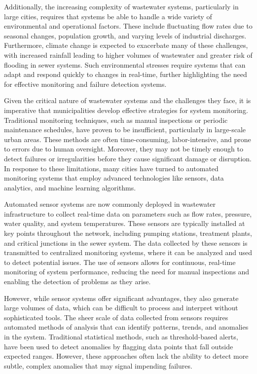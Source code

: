 \documentclass[conference]{IEEEtran}
\begin{document}
Additionally, the increasing complexity of wastewater systems, particularly in large cities, requires that systems be able to handle a wide variety of environmental and operational factors. These include fluctuating flow rates due to seasonal changes, population growth, and varying levels of industrial discharges. Furthermore, climate change is expected to exacerbate many of these challenges, with increased rainfall leading to higher volumes of wastewater and greater risk of flooding in sewer systems. Such environmental stresses require systems that can adapt and respond quickly to changes in real-time, further highlighting the need for effective monitoring and failure detection systems.

Given the critical nature of wastewater systems and the challenges they face, it is imperative that municipalities develop effective strategies for system monitoring. Traditional monitoring techniques, such as manual inspections or periodic maintenance schedules, have proven to be insufficient, particularly in large-scale urban areas. These methods are often time-consuming, labor-intensive, and prone to errors due to human oversight. Moreover, they may not be timely enough to detect failures or irregularities before they cause significant damage or disruption. In response to these limitations, many cities have turned to automated monitoring systems that employ advanced technologies like sensors, data analytics, and machine learning algorithms.

Automated sensor systems are now commonly deployed in wastewater infrastructure to collect real-time data on parameters such as flow rates, pressure, water quality, and system temperatures. These sensors are typically installed at key points throughout the network, including pumping stations, treatment plants, and critical junctions in the sewer system. The data collected by these sensors is transmitted to centralized monitoring systems, where it can be analyzed and used to detect potential issues. The use of sensors allows for continuous, real-time monitoring of system performance, reducing the need for manual inspections and enabling the detection of problems as they arise.

However, while sensor systems offer significant advantages, they also generate large volumes of data, which can be difficult to process and interpret without sophisticated tools. The sheer scale of data collected from sensors requires automated methods of analysis that can identify patterns, trends, and anomalies in the system. Traditional statistical methods, such as threshold-based alerts, have been used to detect anomalies by flagging data points that fall outside expected ranges. However, these approaches often lack the ability to detect more subtle, complex anomalies that may signal impending failures.
\end{document}

